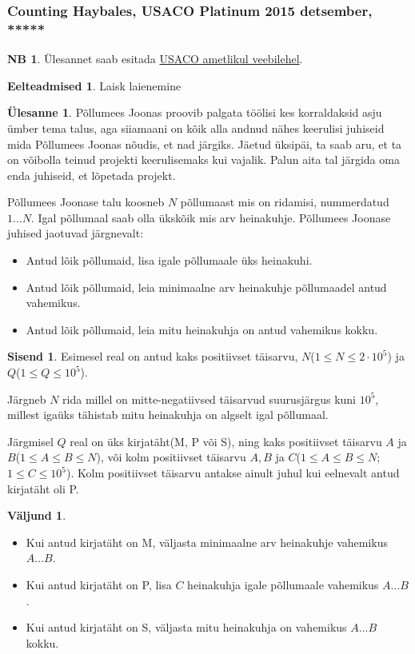 \documentclass{trkut}
\theoremstyle{definition}
\newtheorem*{prereq}{Eelteadmised}
\newtheorem*{extra}{NB}
\newtheorem*{Input}{Sisend}
\newtheorem*{Output}{Väljund}
\newtheorem*{Text}{Ülesanne}
\begin{document}
\subsubsection{Counting Haybales, USACO Platinum 2015 detsember, *****}
\begin{extra}
Ülesannet saab esitada \href{http://www.usaco.org/index.php?page=viewproblem2&cpid=578}{USACO ametlikul veebilehel}.
\end{extra}
\begin{prereq}
Laisk laienemine
\end{prereq}
\begin{Text}
Põllumees Joonas proovib palgata töölisi kes korraldaksid asju ümber tema talus, aga siiamaani on kõik alla andnud nähes keerulisi juhiseid mida Põllumees Joonas nõudis, et nad järgiks. Jäetud üksipäi, ta saab aru, et ta on võibolla teinud projekti keerulisemaks kui vajalik. Palun aita tal järgida oma enda juhiseid, et lõpetada projekt.

Põllumees Joonase talu koosneb $N$ põllumaast mis on ridamisi, nummerdatud $1...N$. Igal põllumaal saab olla ükskõik mis arv heinakuhje.
Põllumees Joonase juhised jaotuvad järgnevalt:
\begin{itemize}
    \item Antud lõik põllumaid, lisa igale põllumaale üks heinakuhi.
    \item Antud lõik põllumaid,  leia minimaalne arv heinakuhje põllumaadel antud vahemikus.
    \item Antud lõik põllumaid,  leia mitu heinakuhja on antud vahemikus kokku.
\end{itemize}

\parencite{11}
\end{Text}
\begin{Input}
Esimesel real on antud kaks positiivset täisarvu, $N$($1\le N\le 2\cdot 10^5$) ja $Q$($1\le Q\le 10^5$).

Järgneb $N$ rida millel on mitte-negatiivsed täisarvud suurusjärgus kuni $10^5$,  millest igaüks tähistab mitu heinakuhja on algselt igal põllumaal.

Järgmisel $Q$ real on üks kirjatäht(M, P või S), ning kaks positiivset täisarvu $A$ ja $B$($1\le A\le B\le N$), või kolm positiivset täisarvu $A, B$ ja $C$($1\le A\le B\le N$; $1\le C\le 10^5$). Kolm positiivset täisarvu antakse ainult juhul kui eelnevalt antud kirjatäht oli P.

\end{Input}
\begin{Output}
\begin{itemize}
    \item Kui antud kirjatäht on M, väljasta minimaalne arv heinakuhje vahemikus $A...B$.
    \item Kui antud kirjatäht on P,  lisa $C$ heinakuhja igale põllumaale vahemikus $A...B$.
    \item Kui antud kirjatäht on S, väljasta mitu heinakuhja on vahemikus $A...B$  kokku.
\end{itemize}
\end{Output}
\end{document}
